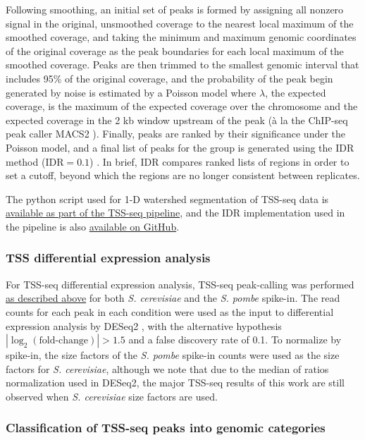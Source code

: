 Following smoothing, an initial set of peaks is formed by assigning all nonzero signal in the original, unsmoothed coverage to the nearest local maximum of the smoothed coverage, and taking the minimum and maximum genomic coordinates of the original coverage as the peak boundaries for each local maximum of the smoothed coverage.
Peaks are then trimmed to the smallest genomic interval that includes 95\% of the original coverage, and the probability of the peak begin generated by noise is estimated by a Poisson model where $\lambda$, the expected coverage, is the maximum of the expected coverage over the chromosome and the expected coverage in the 2 kb window upstream of the peak (\`a la the ChIP-seq peak caller MACS2 \citep{zhang2008}).
Finally, peaks are ranked by their significance under the Poisson model, and a final list of peaks for the group is generated using the IDR method ($\text{IDR}=0.1$) \citep{li2011}.
In brief, IDR compares ranked lists of regions in order to set a cutoff, beyond which the regions are no longer consistent between replicates.

The python script used for 1-D watershed segmentation of TSS-seq data is \href{https://github.com/winston-lab/tss-seq/blob/master/scripts/tss_peakcalling.py}{available as part of the TSS-seq pipeline}, and the IDR implementation used in the pipeline is also \href{https://github.com/nboley/idr}{available on GitHub}.

\subsubsection{TSS differential expression analysis}

For TSS-seq differential expression analysis, TSS-seq peak-calling was performed \hyperref[subsubsec:tss_peak_calling]{as described above} for both \textit{S. cerevisiae} and the \textit{S. pombe} spike-in.
The read counts for each peak in each condition were used as the input to differential expression analysis by DESeq2 \citep{love2014}, with the alternative hypothesis $\allowbreak \left\lvert\log_2 \left(\text{fold-change}\right) \right\rvert > 1.5$ and a false discovery rate of 0.1.
To normalize by spike-in, the size factors of the \textit{S. pombe} spike-in counts were used as the size factors for \textit{S. cerevisiae}, although we note that due to the median of ratios normalization used in DESeq2, the major TSS-seq results of this work are still observed when \textit{S. cerevisiae} size factors are used.

\subsubsection{Classification of TSS-seq peaks into genomic categories}
\label{subsubsec:tss_peak_classification}


